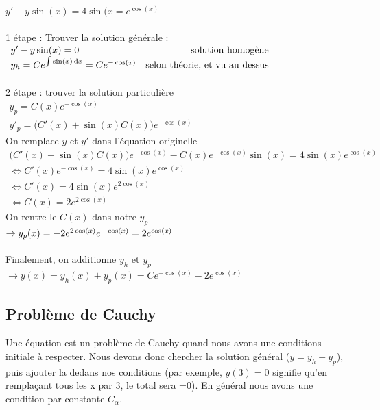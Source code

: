 \documentclass[12pt,a4paper]{article}
\renewcommand{\)}{\right)}
\renewcommand{\(}{\left(}
\begin{document}
\begin{exemple}
	$y' -y\sin(x) = 4\sin(x=e^{\cos(x)}$\\
	\\
	\underline{1 étape : Trouver la solution  générale :}\\
	$\begin{array}{lr}
		y' -y\sin(x) = 0  & \text{solution homogène}\\
		y_h = Ce^{\int\sin(x)\, \mathrm d x} = Ce^{-\cos(x)} & \text{selon théorie, et vu au dessus}\\
	\end{array}$\\
	\\
	\underline{2 étape : trouver la solution particulière}\\
	$\begin{array}{ll}
		y_p = C(x)e^{-\cos(x)}\\
		y'_p = \big(C'(x) + \sin(x)C(x)\big)e^{-\cos(x)}
	\end{array}$\\
	On remplace $y$ et $y'$ dans l'équation originelle\\
	$\begin{array}{l}
		 \big(C'(x) + \sin(x)C(x)\big)e^{-\cos(x)} - C(x)e^{-\cos(x)}\sin(x) = 4\sin(x)e^{\cos(x)}\\
		 \iff C'(x)e^{-\cos(x)} = 4\sin(x)e^{\cos(x)}\\
		 \iff C'(x) = 4\sin(x)e^{2\cos(x)}\\
		 \iff C(x) = 2e^{2\cos(x)}
	\end{array}$\\	
	On rentre le $C(x)$ dans notre $y_p$\\
	$\to y_p(x) = -2e^{2\cos(x)}e^{-\cos(x)}\\
	= 2e^{\cos(x)}$\\
	\\
	\underline{Finalement, on additionne $y_h$ et $y_p$}\\
	$\to y(x) = y_h(x) + y_p(x) = Ce^{-\cos(x)} -2e^{\cos(x)}$
\end{exemple}
\subsection{Problème de Cauchy} 	
Une équation est un problème de Cauchy quand nous avons une conditions initiale à respecter. Nous devons donc chercher la solution général ($y = y_h + y_p$), puis ajouter la dedans nos conditions (par exemple, $y(3) = 0$ signifie qu'en remplaçant tous les x par 3, le total sera =0). En général nous avons une condition par constante $C_\alpha$.
\end{document}

